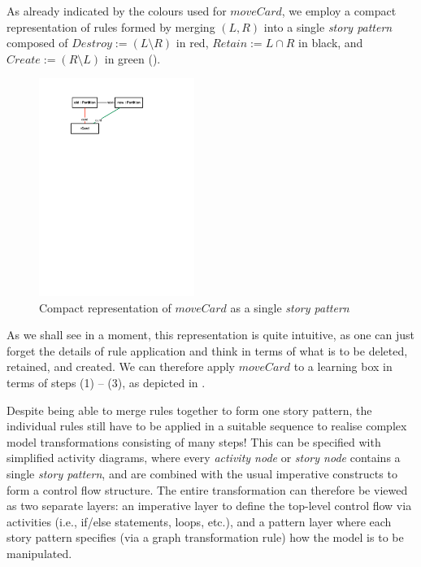 As already indicated by the colours used for $moveCard$, we employ a compact representation of rules formed by merging $(L,R)$ into a single \emph{story
pattern} composed of  $Destroy := (L\setminus R)$ in red, $Retain :=  L\cap R$ in black, and $Create := (R\setminus L)$ in green
().

\begin{figure}[htp]
\begin{center}
  \includegraphics[width=0.45\textwidth]{../../org.moflon.doc.handbook.03_storyDiagrams/02_transformationsExplained/teImages/rule_compact}
  \caption[]{Compact representation of $moveCard$ as a single \emph{story pattern}}
  \label{fig:rule_compact}
\end{center}
\end{figure}

As we shall see in a moment, this  representation is quite intuitive, as one can just forget the details of rule application and think in terms of what is to be
deleted, retained, and created. We can therefore apply $moveCard$ to a learning box in terms of steps (1) -- (3), as depicted in .

Despite being able to merge rules together to form one story pattern, the individual rules still have to be applied in a suitable sequence to realise complex
model transformations consisting of many steps! This can be specified with simplified activity diagrams, where every \emph{activity node}
or \emph{story node} contains a single \emph{story pattern}, and are combined with the usual imperative constructs to form a control flow structure. The entire
transformation can therefore be viewed as two separate layers: an imperative layer to define the top-level control flow via activities (i.e., if/else
statements, loops, etc.), and a pattern layer where each story pattern specifies (via a graph transformation rule) how the model is to be manipulated.

